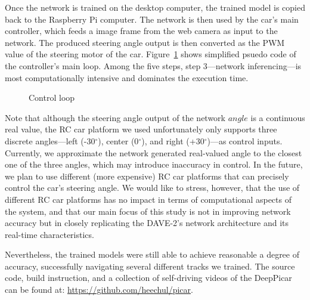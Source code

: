 Once the network is trained on the desktop computer, the trained model
is copied back to the Raspberry Pi computer. The network is then used
by the car's main controller, which feeds a image frame from the web
camera as input to the network. The produced steering angle output is
then converted as the PWM value of the steering motor of the
car. Figure~\ref{fig:controlloop} shows simplified psuedo code of the
controller's main loop. Among the five steps, step 3---network
inferencing---is most computationally intensive and dominates the
execution time.

\begin{figure}[t]
  
  \caption{Control loop}
  \label{fig:controlloop}
\end{figure}

Note that although the steering angle output of the network $angle$ is
a continuous real value, the RC car platform we used unfortunately
only supports three discrete angles---left (-30$^{\circ}$), center
(0$^{\circ}$), and right (+30$^{\circ}$)---as control
inputs. Currently, we approximate the network generated real-valued
angle to the closest one of the three angles, which may
introduce inaccuracy in control.
In the future, we plan to use different (more expensive) RC car
platforms that can precisely control the car's steering angle. We
would like to stress, however, that the use of different RC car
platforms has no impact in terms of computational 
aspects of the system, and that our main focus of this study is
not in improving network accuracy but in closely replicating the
DAVE-2's network architecture and its real-time characteristics.

Nevertheless, the trained models were still able to achieve reasonable
a degree of accuracy, successfully navigating several different tracks 
we trained. The source code, build instruction, and a collection of
self-driving videos of the DeepPicar can be found at:
\url{https://github.com/heechul/picar}.


